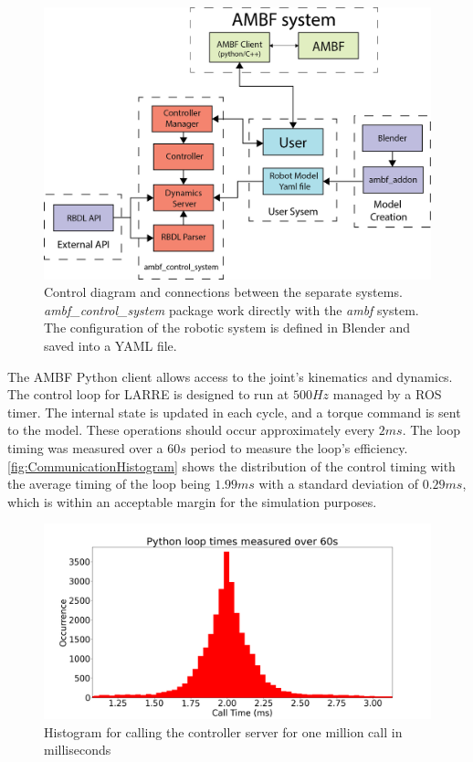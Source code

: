   \begin{figure}[h]
    \centering
    \includegraphics[width=\columnwidth]{images/sim/AMBFSystemDiagram.png}
    \caption[AMBF Control Diagram]{Control diagram and connections between the separate systems. \textit{ambf\_control\_system} package work directly with the \textit{ambf} system. The configuration of the robotic system is defined in Blender and saved into a YAML file.} 
    \label{fig:SystemDiagram}
\end{figure}
 
 The AMBF Python client allows access to the joint's kinematics and dynamics. The control loop for LARRE is designed to run at $500Hz$ managed by a ROS timer. The internal state is updated in each cycle, and a torque command is sent to the model. These operations should occur approximately every $2ms$. The loop timing was measured over a $60s$ period to measure the loop's efficiency. \autoref{fig:CommunicationHistogram} shows the distribution of the control timing with the average timing of the loop being $1.99ms$ with a standard deviation of $0.29ms$, which is within an acceptable margin for the simulation purposes. 
 
  
 \begin{figure}
     \centering
     \includegraphics[width=\linewidth]{images/sim/loop_timming.png}
     \caption[Communication Timing Histogram]{Histogram for calling the controller server for one million call in milliseconds}
     \label{fig:CommunicationHistogram}
 \end{figure}
 


